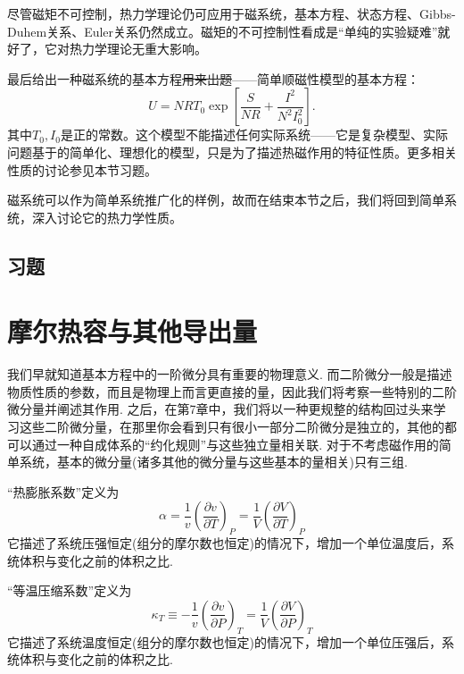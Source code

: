 尽管磁矩不可控制，热力学理论仍可应用于磁系统，基本方程、状态方程、Gibbs-Duhem关系、Euler关系仍然成立。磁矩的不可控制性看成是“单纯的实验疑难”就好了，它对热力学理论无重大影响。

最后给出一种磁系统的基本方程\sout{用来出题}——简单顺磁性模型的基本方程：
\begin{equation}
    U = NRT_0 \exp \left[ \frac{S}{NR} + \frac{I^2}{N^2 I_0^2} \right].
\label{equ3.66}
\end{equation}
其中$T_0, I_0$是正的常数。这个模型不能描述任何实际系统——它是复杂模型、实际问题基于的简单化、理想化的模型，只是为了描述热磁作用的特征性质。更多相关性质的讨论参见本节习题。

磁系统可以作为简单系统推广化的样例，故而在结束本节之后，我们将回到简单系统，深入讨论它的热力学性质。

\subsection*{习题}


\section{摩尔热容与其他导出量}
\label{sec3.9}
我们早就知道基本方程中的一阶微分具有重要的物理意义. 而二阶微分一般是描述物质性质的参数，而且是物理上而言更直接的量，因此我们将考察一些特别的二阶微分量并阐述其作用. 之后，在第7章中，我们将以一种更规整的结构回过头来学习这些二阶微分量，在那里你会看到只有很小一部分二阶微分是独立的，其他的都可以通过一种自成体系的“约化规则”与这些独立量相关联. 对于不考虑磁作用的简单系统，基本的微分量(诸多其他的微分量与这些基本的量相关)只有三组.

“热膨胀系数”定义为
\begin{equation}
\label{equ3.67}
\alpha=\frac{1}{v}\left(\frac{\partial v}{\partial T}\right)_P=\frac{1}{V}\left(\frac{\partial V}{\partial T}\right)_P
\end{equation}
它描述了系统压强恒定(组分的摩尔数也恒定)的情况下，增加一个单位温度后，系统体积与变化之前的体积之比.

“等温压缩系数”定义为
\begin{equation}
\label{equ3.68}
\kappa_T\equiv-\frac{1}{v}\left(\frac{\partial v}{\partial P}\right)_T=\frac{1}{V}\left(\frac{\partial V}{\partial P}\right)_T
\end{equation}
它描述了系统温度恒定(组分的摩尔数也恒定)的情况下，增加一个单位压强后，系统体积与变化之前的体积之比.

